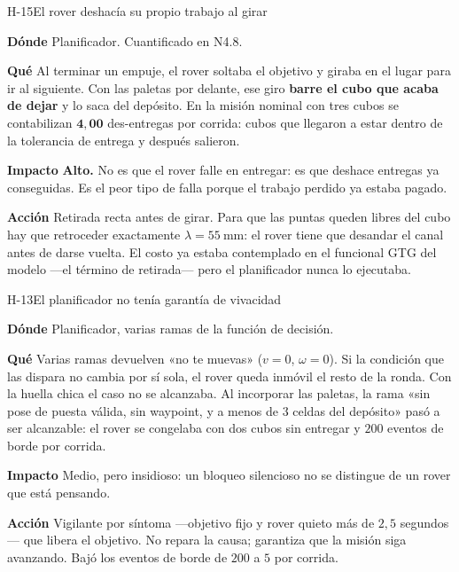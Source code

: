 \documentclass[11pt,a4paper]{article}
\newcommand{\campo}[1]{\par\smallskip\noindent\textbf{#1}\quad\ignorespaces}
\begin{document}
\begin{hallazgo}{H-15}{El rover deshacía su propio trabajo al girar}
\campo{Dónde} Planificador. Cuantificado en N4.8.
\campo{Qué} Al terminar un empuje, el rover soltaba el objetivo y giraba en el lugar para
ir al siguiente. Con las paletas por delante, ese giro \textbf{barre el cubo que acaba de
dejar} y lo saca del depósito. En la misión nominal con tres cubos se contabilizan
$\mathbf{4{,}00}$ des-entregas por corrida: cubos que llegaron a estar dentro de la
tolerancia de entrega y después salieron.
\campo{Impacto} \textbf{Alto.} No es que el rover falle en entregar: es que deshace
entregas ya conseguidas. Es el peor tipo de falla porque el trabajo perdido ya estaba
pagado.
\campo{Acción} Retirada recta antes de girar. Para que las puntas queden libres del cubo
hay que retroceder exactamente $\lambda = 55\ \mathrm{mm}$: el rover tiene que desandar el
canal antes de darse vuelta. El costo ya estaba contemplado en el funcional GTG del modelo
---el término de retirada--- pero el planificador nunca lo ejecutaba.
\end{hallazgo}

\begin{hallazgo}{H-13}{El planificador no tenía garantía de vivacidad}
\campo{Dónde} Planificador, varias ramas de la función de decisión.
\campo{Qué} Varias ramas devuelven «no te muevas» ($v=0$, $\omega=0$). Si la condición que
las dispara no cambia por sí sola, el rover queda inmóvil el resto de la ronda. Con la
huella chica el caso no se alcanzaba. Al incorporar las paletas, la rama «sin pose de
puesta válida, sin waypoint, y a menos de $3$ celdas del depósito» pasó a ser alcanzable:
el rover se congelaba con dos cubos sin entregar y $200$ eventos de borde por corrida.
\campo{Impacto} Medio, pero insidioso: un bloqueo silencioso no se distingue de un rover
que está pensando.
\campo{Acción} Vigilante por síntoma ---objetivo fijo y rover quieto más de $2{,}5$
segundos--- que libera el objetivo. No repara la causa; garantiza que la misión siga
avanzando. Bajó los eventos de borde de $200$ a $5$ por corrida.
\end{hallazgo}
\end{document}
